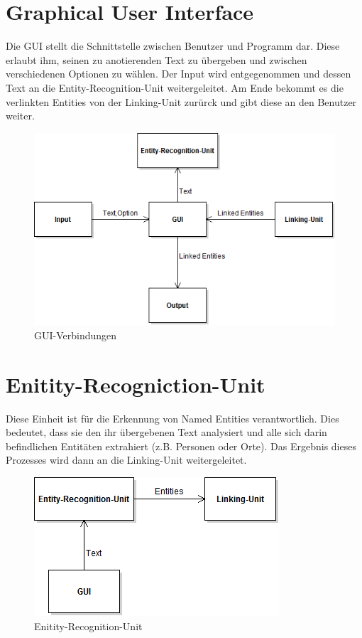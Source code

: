 \documentclass[11pt, a4paper, oneside]{Thesis} %
\begin{document}
\section{Graphical User Interface}
Die GUI stellt die Schnittstelle zwischen Benutzer und Programm dar. Diese erlaubt ihm, seinen zu anotierenden Text zu \"ubergeben und zwischen verschiedenen Optionen zu w\"ahlen. Der Input wird entgegenommen und dessen Text an die Entity-Recognition-Unit weitergeleitet. Am Ende bekommt es die verlinkten Entities von der Linking-Unit zur\"urck und gibt diese an den Benutzer weiter.
\begin{figure}[!ht]
\centering
\includegraphics[scale=0.55]{./GUI.png}
\caption[GUI]{GUI-Verbindungen}
\end{figure}


\section{Enitity-Recogniction-Unit}
Diese Einheit ist f\"ur die Erkennung von Named Entities verantwortlich. Dies bedeutet, dass sie den ihr \"ubergebenen Text analysiert und alle sich darin befindlichen Entit\"aten extrahiert (z.B. Personen oder Orte). Das Ergebnis dieses Prozesses wird dann an die Linking-Unit weitergeleitet.
\begin{figure}[ht!]
\centering
\includegraphics[scale=0.55]{./eeu.png}
\caption[Enitity-Recognition-Unit]{Enitity-Recognition-Unit}
\end{figure}
\end{document}
